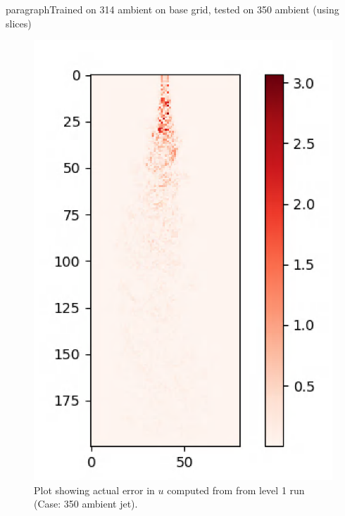 \documentclass{article}
\begin{document}
paragraph{Trained on 314 ambient on base grid, tested on 350 ambient (using slices)}

\begin{figure}[h!]
    \centering
    \includegraphics[width =0.85\linewidth]{figures/314_350_slices_actual.png}
    \caption{Plot showing actual error in $u$ computed from from level 1 run (Case: 350 ambient jet).}
    \label{amr_err}
\end{figure}
\end{document}
